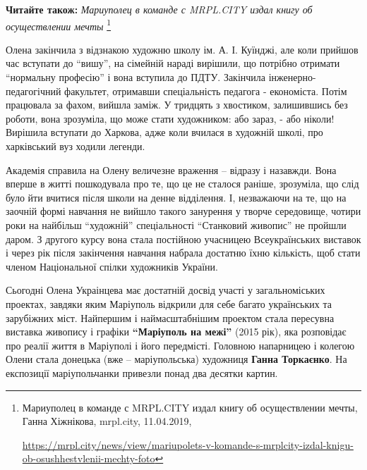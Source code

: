 \textbf{Читайте також:} \emph{Мариуполец в команде с MRPL.CITY издал книгу об осуществлении мечты}%
\footnote{Мариуполец в команде с MRPL.CITY издал книгу об осуществлении мечты, Ганна Хіжнікова, mrpl.city, 11.04.2019, \par%
\url{https://mrpl.city/news/view/mariupolets-v-komande-s-mrplcity-izdal-knigu-ob-osushhestvlenii-mechty-foto}
}

Олена закінчила з відзнакою художню школу ім. А. І. Куїнджі, але коли прийшов
час вступати до \enquote{вишу}, на сімейній нараді вирішили, що потрібно отримати
\enquote{нормальну професію} і вона вступила до ПДТУ.  Закінчила інженерно-педагогічний
факультет, отримавши спеціальність педагога - економіста. Потім працювала за
фахом, вийшла заміж. У тридцять з хвостиком, залишившись без роботи, вона
зрозуміла, що може стати художником: або зараз, - або ніколи!  Вирішила
вступати до Харкова, адже коли вчилася в художній школі, про харківський вуз
ходили легенди.

Академія справила на Олену величезне враження – відразу і назавжди. Вона вперше
в житті пошкодувала про те, що це не сталося раніше, зрозуміла, що слід було
йти вчитися після школи на денне відділення. І, незважаючи на те, що на заочній
формі навчання не вийшло такого занурення у творче середовище, чотири роки на
найбільш \enquote{художній} спеціальності \enquote{Станковий живопис} не
пройшли даром. З другого курсу вона стала постійною учасницею Всеукраїнських
виставок і через рік після закінчення навчання набрала достатню їхню кількість,
щоб стати членом Національної спілки художників України.


Сьогодні Олена Украінцева має достатній досвід участі у загальноміських
проектах, завдяки яким Маріуполь відкрили для себе багато українських та
зарубіжних міст. Найпершим і наймасштабнішим проектом стала пересувна виставка
живопису і графіки \textbf{\enquote{Маріуполь на межі}} (2015 рік), яка розповідає про реалії
життя в Маріуполі і його передмісті. Головною напарницею і колегою Олени стала
донецька (вже – маріупольська) художниця \textbf{Ганна Торкаєнко}. На експозиції
маріупольчанки привезли понад два десятки картин.


